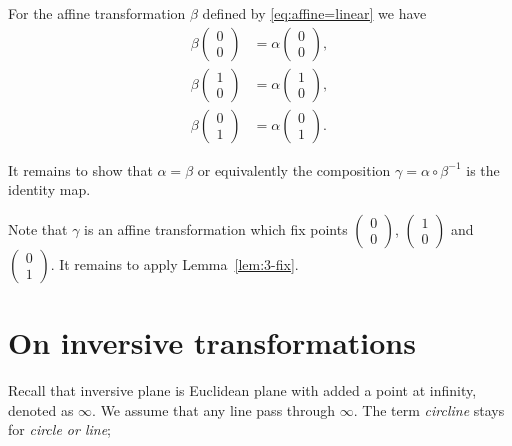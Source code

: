 For the affine transformation $\beta$ defined by \ref{eq:affine=linear}
we have 
\begin{align*}
\beta\left(\begin{smallmatrix}
0\\ 0
\end{smallmatrix} \right)
&=
\alpha\left(\begin{smallmatrix}
0\\ 0
\end{smallmatrix} \right),
\\
\beta\left(\begin{smallmatrix}
1\\ 0
\end{smallmatrix} \right)
&=
\alpha\left(\begin{smallmatrix}
1\\ 0
\end{smallmatrix} \right),
\\
\beta\left(\begin{smallmatrix}
0\\ 1
\end{smallmatrix} \right)
&=
\alpha\left(\begin{smallmatrix}
0\\ 1
\end{smallmatrix} \right).
\end{align*}


It remains to show that $\alpha=\beta$ or equivalently the composition $\gamma=\alpha\circ \beta^{-1}$ is the identity map.

Note that $\gamma$ is an affine transformation which fix points $\left(\begin{smallmatrix}
0\\ 0
\end{smallmatrix} \right)$, 
$\left(\begin{smallmatrix}
1\\ 0
\end{smallmatrix} \right)$ 
and $\left(\begin{smallmatrix}
0\\ 1
\end{smallmatrix} \right)$.
It remains to apply Lemma~\ref{lem:3-fix}.
\qeds

\section*{On inversive transformations}


Recall that inversive plane is Euclidean plane with added a point at infinity, denoted as $\infty$.
We assume that any line pass through $\infty$.
The term {}\emph{circline} stays for {}\emph{circle or line};


